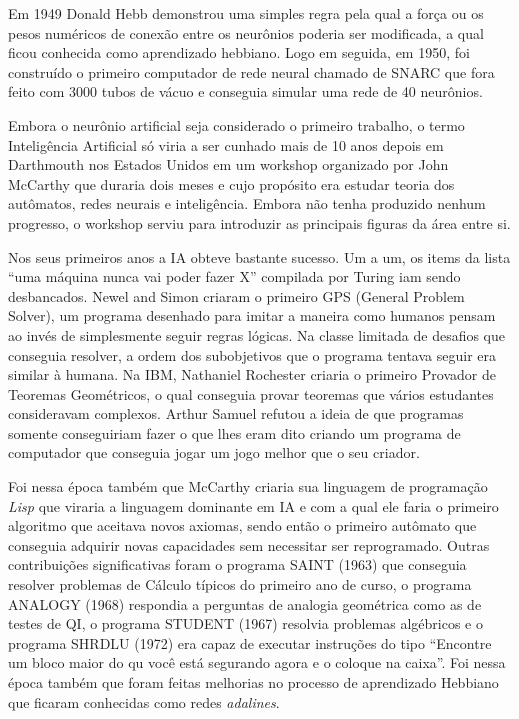\documentclass[cic,tc]{iiufrgs}
\begin{document}
Em 1949 Donald Hebb demonstrou uma simples regra pela qual a força ou os pesos
numéricos de conexão entre os neurônios poderia ser modificada, a qual ficou
conhecida como aprendizado hebbiano. Logo em seguida, em 1950, foi construído o
primeiro computador de rede neural chamado de SNARC que fora feito com 3000
tubos de vácuo e conseguia simular uma rede de 40 neurônios.

Embora o neurônio artificial seja considerado o primeiro trabalho, o termo
Inteligência Artificial só viria a ser cunhado mais de 10 anos depois em
Darthmouth nos Estados Unidos em um workshop organizado por John McCarthy que
duraria dois meses e cujo propósito era estudar teoria dos autômatos, redes
neurais e inteligência. Embora não tenha produzido nenhum progresso, o workshop
serviu para introduzir as principais figuras da área entre si.

Nos seus primeiros anos a IA obteve bastante sucesso. Um a um, os items da
lista ``uma máquina nunca vai poder fazer X'' compilada por Turing iam sendo
desbancados. Newel and Simon criaram o primeiro GPS (General Problem Solver),
um programa desenhado para imitar a maneira como humanos pensam ao invés de
simplesmente seguir regras lógicas. Na classe limitada de desafios que
conseguia resolver, a ordem dos subobjetivos que o programa tentava seguir era
similar à humana. Na IBM, Nathaniel Rochester criaria o primeiro Provador de
Teoremas Geométricos, o qual conseguia provar teoremas que vários estudantes
consideravam complexos.  Arthur Samuel refutou a ideia de que programas somente
conseguiriam fazer o que lhes eram dito criando um programa de computador que
conseguia jogar um jogo melhor que o seu criador.

Foi nessa época também que McCarthy criaria sua linguagem de programação
\emph{Lisp} que viraria a linguagem dominante em IA e com a qual ele faria o
primeiro algoritmo que aceitava novos axiomas, sendo então o primeiro autômato
que conseguia adquirir novas capacidades sem necessitar ser reprogramado.
Outras contribuições significativas foram o programa SAINT (1963) que conseguia
resolver problemas de Cálculo típicos do primeiro ano de curso, o programa
ANALOGY (1968) respondia a perguntas de analogia geométrica como as de testes
de QI, o programa STUDENT (1967) resolvia problemas algébricos e o programa
SHRDLU (1972) era capaz de executar instruções do tipo ``Encontre um bloco
maior do qu você está segurando agora e o coloque na caixa''. Foi nessa época
também que foram feitas melhorias no processo de aprendizado Hebbiano que
ficaram conhecidas como redes \emph{adalines}.
\end{document}
